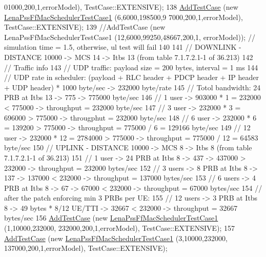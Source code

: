 \begin{DoxyCode}
      01000,200,1,errorModel), TestCase::EXTENSIVE);
138   \hyperlink{classns3_1_1TestCase_a3718088e3eefd5d6454569d2e0ddd835}{AddTestCase} (\textcolor{keyword}{new} \hyperlink{classLenaPssFfMacSchedulerTestCase1}{LenaPssFfMacSchedulerTestCase1} (6,6000,198500,9
      7000,200,1,errorModel), TestCase::EXTENSIVE);
139   \textcolor{comment}{//AddTestCase (new LenaPssFfMacSchedulerTestCase1 (12,6000,99250,48667,200,1, errorModel)); // simulation
       time = 1.5, otherwise, ul test will fail}
140 
141   \textcolor{comment}{// DOWNLINK - DISTANCE 10000 -> MCS 14 -> Itbs 13 (from table 7.1.7.2.1-1 of 36.213)}
142   \textcolor{comment}{// Traffic info}
143   \textcolor{comment}{//   UDP traffic: payload size = 200 bytes, interval = 1 ms}
144   \textcolor{comment}{//   UDP rate in scheduler: (payload + RLC header + PDCP header + IP header + UDP header) * 1000 byte/sec
       -> 232000 byte/rate }
145   \textcolor{comment}{// Totol bandwidth: 24 PRB at Itbs 13 -> 775 -> 775000 byte/sec}
146   \textcolor{comment}{// 1 user -> 903000 * 1 = 232000 < 775000 -> throughput = 232000 byte/sec}
147   \textcolor{comment}{// 3 user -> 232000 * 3 = 696000 > 775000 -> througphut = 232000 byte/sec}
148   \textcolor{comment}{// 6 user -> 232000 * 6 = 139200 > 775000 -> throughput = 775000 / 6 = 129166 byte/sec}
149   \textcolor{comment}{// 12 user -> 232000 * 12 = 2784000 > 775000 -> throughput =  775000 / 12 = 64583 byte/sec}
150   \textcolor{comment}{// UPLINK - DISTANCE 10000 -> MCS 8 -> Itbs 8 (from table 7.1.7.2.1-1 of 36.213)}
151   \textcolor{comment}{// 1 user -> 24 PRB at Itbs 8 -> 437 -> 437000 > 232000 -> throughput = 232000 bytes/sec}
152   \textcolor{comment}{// 3 users -> 8 PRB at Itbs 8 -> 137 -> 137000 < 232000 -> throughput = 137000 bytes/sec}
153   \textcolor{comment}{// 6 users -> 4 PRB at Itbs 8 -> 67 -> 67000 < 232000 -> throughput = 67000 bytes/sec}
154   \textcolor{comment}{// after the patch enforcing min 3 PRBs per UE:}
155   \textcolor{comment}{// 12 users -> 3 PRB at Itbs 8 -> 49 bytes * 8/12 UE/TTI -> 32667 < 232000 -> throughput = 32667 
       bytes/sec}
156   \hyperlink{classns3_1_1TestCase_a3718088e3eefd5d6454569d2e0ddd835}{AddTestCase} (\textcolor{keyword}{new} \hyperlink{classLenaPssFfMacSchedulerTestCase1}{LenaPssFfMacSchedulerTestCase1} (1,10000,232000,
      232000,200,1,errorModel), TestCase::EXTENSIVE);
157   \hyperlink{classns3_1_1TestCase_a3718088e3eefd5d6454569d2e0ddd835}{AddTestCase} (\textcolor{keyword}{new} \hyperlink{classLenaPssFfMacSchedulerTestCase1}{LenaPssFfMacSchedulerTestCase1} (3,10000,232000,
      137000,200,1,errorModel), TestCase::EXTENSIVE);

\end{DoxyCode}
